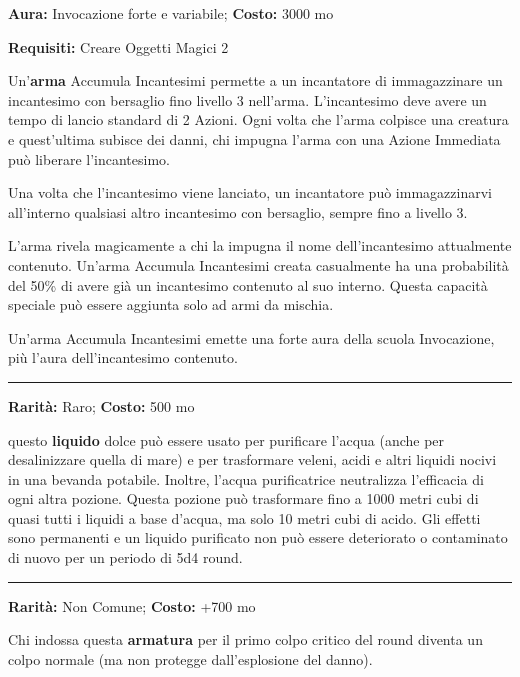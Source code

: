 \begin{multicols}{2}
\textbf{Aura:} Invocazione forte e variabile; \textbf{Costo:} 3000 mo

\textbf{Requisiti:} Creare Oggetti Magici 2

Un'\textbf{arma} Accumula Incantesimi permette a un incantatore di immagazzinare un incantesimo con bersaglio fino livello 3 nell'arma. L'incantesimo deve avere un tempo di lancio standard di 2 Azioni. Ogni volta che l'arma colpisce una creatura e quest'ultima subisce dei danni, chi impugna l'arma con una Azione Immediata può liberare l'incantesimo.

Una volta che l'incantesimo viene lanciato, un incantatore può immagazzinarvi all'interno qualsiasi altro incantesimo con bersaglio, sempre fino a livello 3.

L'arma rivela magicamente a chi la impugna il nome dell'incantesimo attualmente contenuto. Un'arma Accumula Incantesimi creata casualmente ha una probabilità del 50\% di avere già un incantesimo contenuto al suo interno. Questa capacità speciale può essere aggiunta solo ad armi da mischia.

Un'arma Accumula Incantesimi emette una forte aura della scuola Invocazione, più l'aura dell'incantesimo contenuto.

\smallskip\noindent\rule{\linewidth}{2pt}  \hypertarget{Acquapurificatrice}{}\smallskip{}\noindent\label{Acquapurificatrice}

\textbf{Rarità:} Raro; \textbf{Costo:} 500 mo

questo \textbf{liquido} dolce può essere usato per purificare l'acqua (anche per desalinizzare quella di mare) e per trasformare veleni, acidi e altri liquidi nocivi in una bevanda potabile. Inoltre, l'acqua purificatrice neutralizza l'efficacia di ogni altra pozione. Questa pozione può trasformare fino a 1000 metri cubi di quasi tutti i liquidi a base d'acqua, ma solo 10 metri cubi di acido. Gli effetti sono permanenti e un liquido purificato non può essere deteriorato o contaminato di nuovo per un periodo di 5d4 round.

\smallskip\noindent\rule{\linewidth}{2pt}  \hypertarget{Adamantio}{}\smallskip{}\noindent\label{Adamantio}

\textbf{Rarità:} Non Comune; \textbf{Costo:} +700 mo

Chi indossa questa \textbf{armatura} per il primo colpo critico del round diventa un colpo normale (ma non protegge dall'esplosione del danno).


\end{multicols}
